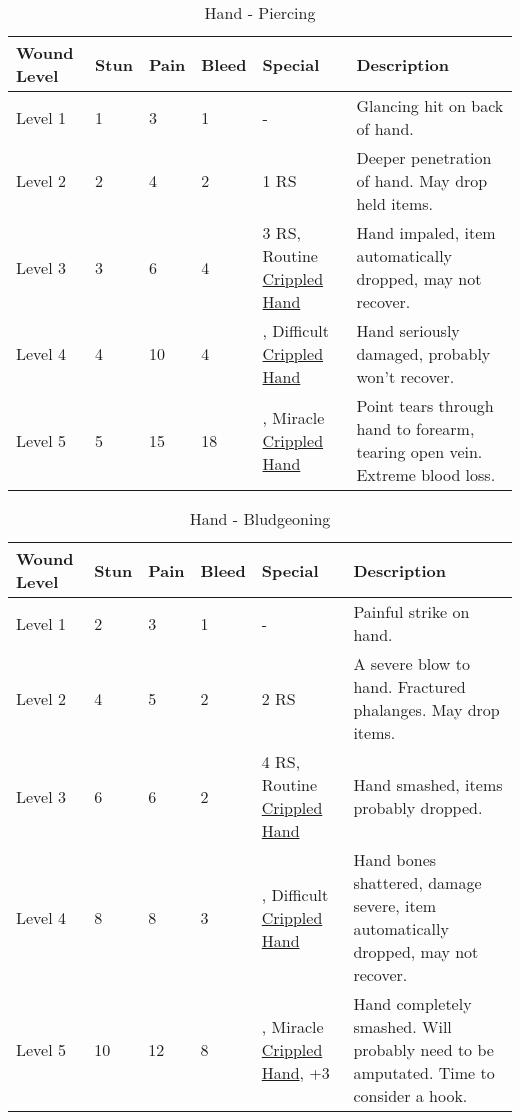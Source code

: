 \documentclass[oneside,11pt,english]{book}
\begin{document}
\begin{table}[!hb] %
	\caption{Hand - Piercing}
	\label{wound:Hand - Piercing}
	\begin{tabu} to 
Wound Level &Stun &Pain &Bleed &Special &Description\\\toprule
Level 1& 1& 3& 1& - &Glancing hit on back of hand.\\
Level 2& 2& 4& 2&  1 RS &Deeper penetration of hand. May drop held items.\\
Level 3& 3& 6& 4
	& 3 RS, \newline
		Routine  \hyperref[bane:Crippled Limb/Appendage]{Crippled Hand}
	&Hand impaled, item automatically dropped, may not recover.\\
Level 4&4&10&4
	&, \newline
		Difficult  \hyperref[bane:Crippled Limb/Appendage]{Crippled Hand} 
	&Hand seriously damaged, probably won't recover.\\
Level 5& 5& 15& 18
	&, \newline
		Miracle  \hyperref[bane:Crippled Limb/Appendage]{Crippled Hand}
	&Point tears through hand to forearm, tearing open vein. Extreme blood loss.\\
	\end{tabu}
\end{table}

\begin{table}[!hb] %
	\caption{Hand - Bludgeoning}
	\label{wound:Hand - Bludgeoning}
	\begin{tabu} to 
Wound Level &Stun &Pain &Bleed &Special &Description\\\toprule
Level 1& 2& 3& 1& - &Painful strike on hand.\\
Level 2& 4& 5& 2&  2 RS &A severe blow to hand. Fractured phalanges. May drop items.\\
Level 3& 6& 6& 2
	& 4 RS, \newline
		Routine  \hyperref[bane:Crippled Limb/Appendage]{Crippled Hand}
	&Hand smashed, items probably dropped.\\
Level 4& 8& 8& 3
	&, \newline
		Difficult  \hyperref[bane:Crippled Limb/Appendage]{Crippled Hand}
	&Hand bones shattered, damage severe, item automatically dropped, may not recover.\\
Level 5& 10& 12& 8
	&, \newline
		Miracle  \hyperref[bane:Crippled Limb/Appendage]{Crippled Hand}, \newline
		 +3
	&Hand completely smashed. Will probably need to be amputated. Time to consider a hook.\\
	\end{tabu}
\end{table}
\end{document}

